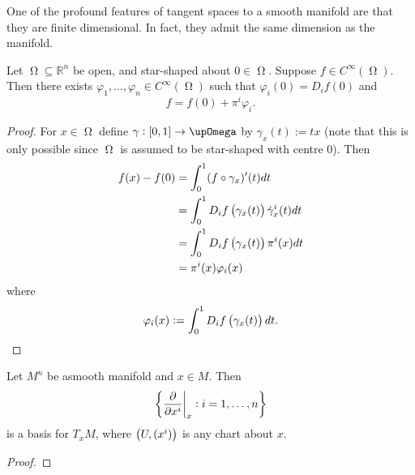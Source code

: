 One of the profound features of tangent spaces to a smooth manifold are that they are finite dimensional. In fact, they admit the same dimension as the manifold.

\begin{lemma}
	\label{lem:star_shaped}
	Let $\upOmega \subseteq \mathbb{R}^n$ be open, and star-shaped about $0 \in \upOmega$. Suppose $f \in C^\infty(\upOmega)$. Then there exists $\varphi_1,\dots,\varphi_n \in C^\infty(\upOmega)$ such that $\varphi_i(0) = D_if(0)$ and
	\begin{equation*}
		f = f(0) + \pi^i \varphi_i.
	\end{equation*}
\end{lemma}

\begin{proof}
	For $x \in \upOmega$ define $\gamma : \intcc{0,1} \to \upOmega$ by $\gamma_x(t) := tx$ (note that this is only possible since $\upOmega$ is assumed to be star-shaped with centre $0$). Then
	\begin{align*}
		f(x) - f(0) &= \int_0^1 (f \circ \gamma_x)'(t) dt\\
		&= \int_0^1 D_if\del[1]{\gamma_x(t)} \dot{\gamma}^i_x(t) dt\\
		&= \int_0^1 D_if\del[1]{\gamma_x(t)} \pi^i(x)dt\\
		&= \pi^i(x)\varphi_i(x)
	\end{align*}
	\noindent where
	\begin{equation*}
		\varphi_i(x) := \int_0^1 D_if\del[1]{\gamma_x(t)} dt.
	\end{equation*}
\end{proof}

\begin{proposition}
	Let $M^n$ be asmooth manifold and $x \in M$. Then 
	\begin{equation*}
		\cbr[3]{\frac{\partial}{\partial x^i}\bigg\vert_x : i = 1,\dots,n}
	\end{equation*}
	\noindent is a basis for $T_xM$, where $\del[1]{U,(x^i)}$ is any chart about $x$.
\end{proposition}

\begin{proof}

\end{proof}

